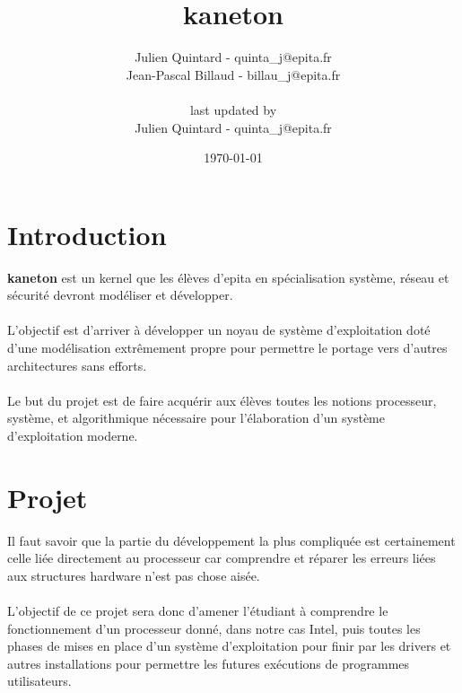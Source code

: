 \documentclass[10pt,a4wide]{article}
\title{kaneton}
\author{Julien Quintard - \small{quinta\_j@epita.fr} \\
        Jean-Pascal Billaud - \small{billau\_j@epita.fr} \\ \\
        \small{last updated by} \\
        Julien Quintard - \small{quinta\_j@epita.fr}}
\date{\today}
\begin{document}
\maketitle

\tableofcontents

\newpage

\section{Introduction}

\textbf{kaneton} est un kernel que les \'el\`eves d'epita en sp\'ecialisation
syst\`eme, r\'eseau et s\'ecurit\'e devront mod\'eliser et d\'evelopper.

\paragraph{}

L'objectif est d'arriver \`a d\'evelopper un noyau de syst\`eme d'exploitation
dot\'e d'une mod\'elisation extr\^emement propre pour permettre le portage
vers d'autres architectures sans efforts.

\paragraph{}

Le but du projet est de faire acqu\'erir aux \'el\`eves toutes les notions
processeur, syst\`eme, et algorithmique n\'ecessaire pour l'\'elaboration
d'un syst\`eme d'exploitation moderne.

\newpage

\section{Projet}

Il faut savoir que la partie du d\'eveloppement la plus compliqu\'ee est
certainement celle li\'ee directement au processeur car comprendre
et r\'eparer les erreurs li\'ees aux structures hardware n'est pas chose
ais\'ee.

\paragraph{}

L'objectif de ce projet sera donc d'amener l'\'etudiant \`a comprendre le
fonctionnement d'un processeur donn\'e, dans notre cas Intel, puis toutes
les phases de mises en place d'un syst\`eme d'exploitation pour finir
par les drivers et autres installations pour permettre les futures ex\'ecutions
de programmes utilisateurs.
\end{document}
